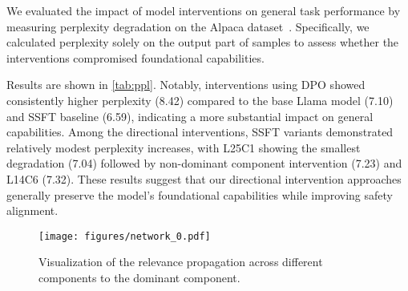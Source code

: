 We evaluated the impact of model interventions on general task performance by measuring perplexity degradation on the Alpaca dataset~\cite{alpaca}. Specifically, we calculated perplexity solely on the output part of samples to assess whether the interventions compromised foundational capabilities.

Results are shown in \autoref{tab:ppl}.
Notably, interventions using DPO showed consistently higher perplexity (8.42) compared to the base Llama model (7.10) and SSFT baseline (6.59), indicating a more substantial impact on general capabilities.
Among the directional interventions, SSFT variants demonstrated relatively modest perplexity increases, with L25C1 showing the smallest degradation (7.04) followed by non-dominant component intervention (7.23) and L14C6 (7.32). These results suggest that our directional intervention approaches generally preserve the model's foundational capabilities while improving safety alignment.


\begin{figure*}[h]
    \vskip 0.2in
    \begin{center}
    \centerline{\texttt{[image: figures/network\_0.pdf]}}
    \caption{Visualization of the relevance propagation across different components to the dominant component.}
    \end{center}
    \vskip -0.2in
\end{figure*}